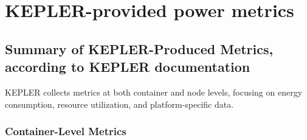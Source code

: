 

\chapter{KEPLER-provided power metrics} %

\label{AppendixA} %

\section{Summary of KEPLER-Produced Metrics, according to KEPLER documentation\parencite{KEPLERDocumentation}}

KEPLER collects metrics at both container and node levels, focusing on energy consumption, resource utilization, and platform-specific data.

\subsection{Container-Level Metrics}

